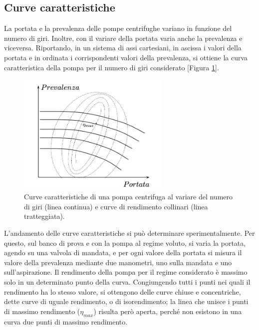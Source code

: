 \documentclass[laurea,oneside,11pt]{USiena_tesiLM}
\begin{document}
\subsection{Curve caratteristiche}
La portata e la prevalenza delle pompe centrifughe variano in funzione del numero di giri. Inoltre, con il variare della portata varia anche la prevalenza e viceversa. Riportando, in un sistema di assi cartesiani, in ascissa i valori della portata e in ordinata i corrispondenti valori della prevalenza, si ottiene la curva caratteristica della pompa per il numero di giri considerato [Figura \ref{fig:curve_car}].

\begin{figure}[!ht]
\centering
\includegraphics[width=0.65\textwidth]{figure/curve_car} 
\caption{Curve caratteristiche di una pompa centrifuga al variare del numero di giri (linea continua) e curve di rendimento collinari (linea tratteggiata).}
\label{fig:curve_car}
\end{figure}

L'andamento delle curve caratteristiche si può determinare sperimentalmente.
Per questo, sul banco di prova e con la pompa al regime voluto, si varia la portata, agendo
su una valvola di mandata, e per ogni valore della portata si misura il valore della
prevalenza mediante due manometri, uno sulla mandata e uno sull'aspirazione.
Il rendimento della pompa per il regime considerato è massimo solo in un determinato punto della curva.
Congiungendo tutti i punti nei quali il rendimento ha lo stesso valore, si ottengono delle curve chiuse e concentriche, dette curve di uguale rendimento, o di isorendimento; la linea che unisce i punti di massimo rendimento ($\eta_{max}$) risulta però aperta, perché non esistono in una curva due punti di massimo rendimento.
\end{document}
